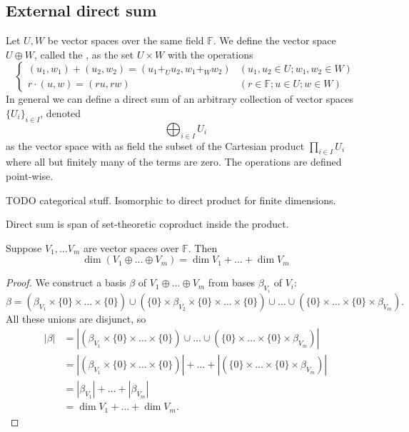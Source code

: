 \subsection{External direct sum}
\begin{definition}
Let $U,W$ be vector spaces over the same field $\mathbb{F}$. We define the vector space  $U\oplus W$, called the , as the set $U\times W$ with the operations
\[ \begin{cases}
(u_1,w_1) + (u_2, w_2) = (u_1 +_U u_2, w_1 +_W w_2) & (u_1,u_2 \in U; w_1, w_2 \in W) \\
r\cdot (u,w) = (ru, rw) & (r\in \mathbb{F}; u\in U; w \in W)
\end{cases} \]
In general we can define a direct sum of an arbitrary collection of vector spaces $\{U_i\}_{i\in I}$, denoted
\[ \bigoplus_{i\in I}U_i \]
as the vector space with as field the subset of the Cartesian product $\prod_{i\in I}U_i$ where all but finitely many of the terms are zero. The operations are defined point-wise.
\end{definition}

TODO categorical stuff. Isomorphic to direct product for finite dimensions.

\begin{proposition}
Direct sum is span of set-theoretic coproduct inside the product.
\end{proposition}


\begin{proposition}
Suppose $V_1, \ldots V_m$ are vector spaces over $\mathbb{F}$. Then
\[ \dim(V_1\oplus\ldots \oplus V_m) = \dim V_1 + \ldots + \dim V_m \]
\label{dimDirectSum}
\end{proposition}
\begin{proof}
We construct a basis $\beta$ of $V_1\oplus\ldots \oplus V_m$ from bases $\beta_{V_i}$ of $V_i$:
\[ \beta = (\beta_{V_1} \times \{0 \} \times \ldots \times \{0 \}) \cup (\{0 \} \times \beta_{V_2}\times \{0 \} \times \ldots \times \{0 \}) \cup \ldots \cup (\{0 \}\times \ldots \times \{0 \} \times \beta_{V_m}). \]
All these unions are disjunct, so
\begin{align*}
|\beta| &= |(\beta_{V_1} \times \{0 \} \times \ldots \times \{0 \}) \cup  \ldots \cup (\{0 \}\times \ldots \times \{0 \} \times \beta_{V_m})| \\
&= |(\beta_{V_1} \times \{0 \} \times \ldots \times \{0 \})| + \ldots + |(\{0 \}\times \ldots \times \{0 \} \times \beta_{V_m})| \\
&= | \beta_{V_1}| + \ldots + |\beta_{V_m}| \\
&= \dim V_1 + \ldots + \dim V_m.
\end{align*}
\end{proof}

